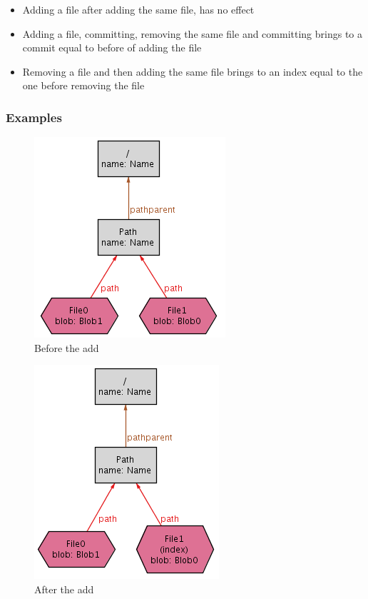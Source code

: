 \begin{itemize}
	\item Adding a file after adding the same file, has no effect
	\item Adding a file, committing, removing the same file and 
	committing brings to a commit equal to before of adding the file
	\item Removing a file and then adding the same file brings to an
	index equal to the one before removing the file
\end{itemize}

\subsubsection{Examples}

\begin{figure}[h!] 
	\caption{Before the add}
	\centering
	\includegraphics[scale=0.65]{images/add1.png}
\end{figure}

\begin{figure}[h!] 
	\caption{After the add}
	\centering
	\includegraphics[scale=0.65]{images/add2.png}
\end{figure}

